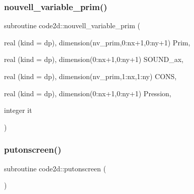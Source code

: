 \subsubsection{\texorpdfstring{nouvell\+\_\+variable\+\_\+prim()}{nouvell\_variable\_prim()}}
{\footnotesize\ttfamily subroutine code2d\+::nouvell\+\_\+variable\+\_\+prim (\begin{DoxyParamCaption}\item[{real (kind = dp), dimension(nv\+\_\+prim,0\+:nx+1,0\+:ny+1)}]{Prim,  }\item[{real (kind = dp), dimension(0\+:nx+1,0\+:ny+1)}]{S\+O\+U\+N\+D\+\_\+ax,  }\item[{real (kind = dp), dimension(nv\+\_\+prim,1\+:nx,1\+:ny)}]{C\+O\+NS,  }\item[{real (kind = dp), dimension(0\+:nx+1,0\+:ny+1)}]{Pression,  }\item[{integer}]{it }\end{DoxyParamCaption})}

\mbox{\label{mainSW_8f90_a8a5b072c001df1496416cc96562c9916}} 
\subsubsection{\texorpdfstring{putonscreen()}{putonscreen()}}
{\footnotesize\ttfamily subroutine code2d\+::putonscreen (\begin{DoxyParamCaption}{ }\end{DoxyParamCaption})}

